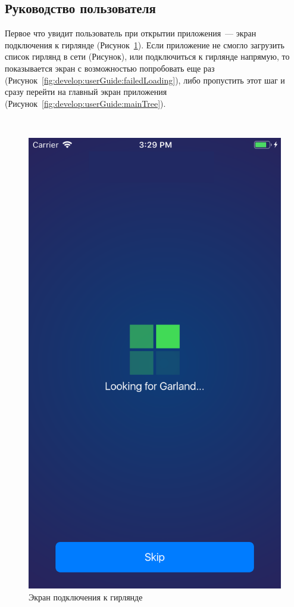 \newpage
\subsection{Руководство пользователя}
\label{sec:develop:userGuide}

Первое что увидит пользователь при открытии приложения~--- экран подключения к гирлянде (Рисунок~\ref{fig:develop:userGuide:loading}). Если приложение не смогло загрузить список гирлянд в сети (Рисунок), или подключиться к гирлянде напрямую, то показывается экран с возможностью попробовать еще раз (Рисунок~\ref{fig:develop:userGuide:failedLoading}), либо пропустить этот шаг и сразу перейти на главный экран приложения (Рисунок~\ref{fig:develop:userGuide:mainTree}).

~
\begin{figure}[H]
\centering
	\includegraphics[scale=0.25]{figures/userGuide/loading.png}
	\caption{Экран подключения к гирлянде}
	\label{fig:develop:userGuide:loading}
\end{figure}
